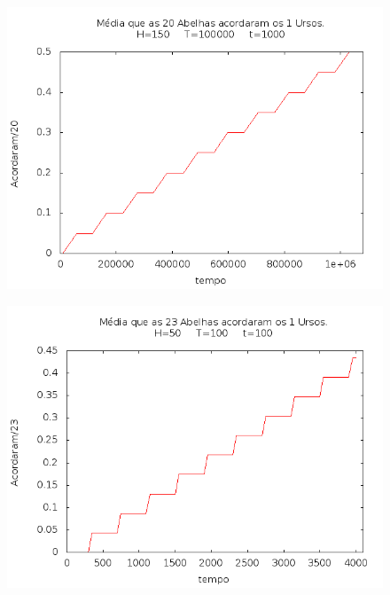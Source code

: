 \documentclass[12pt,a4paper]{article}
\begin{document}
\begin{figure}[!htb]
\centering
\includegraphics[width=0.7\paperwidth]{./graficos/abelhas_20_1_150_1000_100000.png}
\label{Rotulo}
\end{figure}

\begin{figure}[!htb]
\centering
\includegraphics[width=0.7\paperwidth]{./graficos/abelhas_23_1_50_100_100.png}
\label{Rotulo}
\end{figure}
\end{document}
